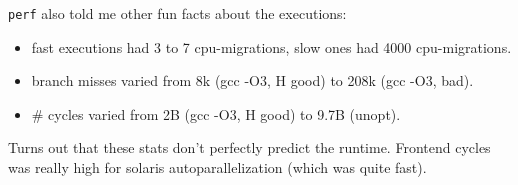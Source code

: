 {\tt perf} also told me other fun facts about the executions:

\begin{itemize}
\item fast executions had 3 to 7 cpu-migrations, slow ones had 4000 cpu-migrations.
\item branch misses varied from 8k (gcc -O3, H good) to 208k (gcc -O3, bad).
\item \# cycles varied from 2B (gcc -O3, H good) to 9.7B (unopt).\\
\end{itemize}

Turns out that these stats don't perfectly predict the runtime. Frontend cycles was really
high for solaris autoparallelization (which was quite fast). 
      







